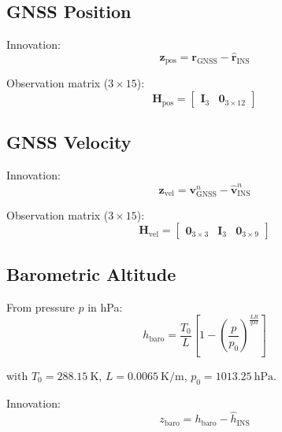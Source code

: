 \documentclass[11pt,a4paper]{article}
\newcommand{\mat}[1]{\mathbf{#1}}
\begin{document}
\subsection{GNSS Position}

Innovation:
\begin{equation}
    \mat{z}_{\text{pos}} = \mat{r}_{\text{GNSS}} - \hat{\mat{r}}_{\text{INS}}
\end{equation}

Observation matrix ($3 \times 15$):
\begin{equation}
    \mat{H}_{\text{pos}} = \begin{bmatrix}
        \mat{I}_{3} & \mat{0}_{3\times12}
    \end{bmatrix}
\end{equation}

\subsection{GNSS Velocity}

Innovation:
\begin{equation}
    \mat{z}_{\text{vel}} = \mat{v}_{\text{GNSS}}^n - \hat{\mat{v}}_{\text{INS}}^n
\end{equation}

Observation matrix ($3 \times 15$):
\begin{equation}
    \mat{H}_{\text{vel}} = \begin{bmatrix}
        \mat{0}_{3\times3} & \mat{I}_{3} & \mat{0}_{3\times9}
    \end{bmatrix}
\end{equation}

\subsection{Barometric Altitude}

From pressure $p$ in \si{\hecto\pascal}:
\begin{equation}
    h_{\text{baro}} = \frac{T_0}{L}\left[1 - \left(\frac{p}{p_0}\right)^{\frac{LR}{gM}}\right]
\end{equation}

with $T_0 = \SI{288.15}{\kelvin}$, $L = \SI{0.0065}{\kelvin\per\meter}$, $p_0 = \SI{1013.25}{\hecto\pascal}$.

Innovation:
\begin{equation}
    z_{\text{baro}} = h_{\text{baro}} - \hat{h}_{\text{INS}}
\end{equation}
\end{document}
